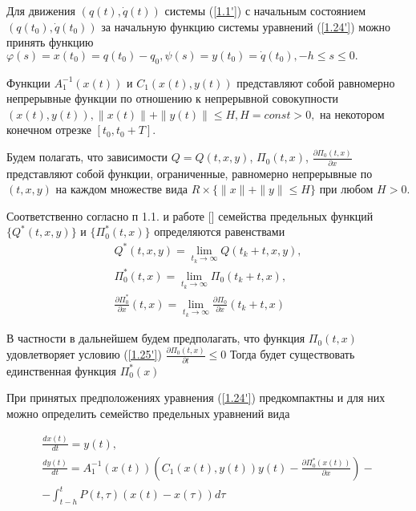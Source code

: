 Для движения $(q(t), \dot q(t))$ системы (\ref{1.1'}) с начальным состоянием $(q(t_0), \dot q(t_0))$ за начальную функцию системы уравнений (\ref{1.24'}) можно принять функцию $\varphi (s) = x(t_0) = q(t_0) - q_0, \psi (s) = y(t_0) = \dot q (t_0), -h \le s \le 0.$

Функции $A_1^{-1} (x(t))$ и $C_1(x(t), y(t))$ представляют собой равномерно непрерывные функции по отношению к непрерывной совокупности $(x(t), y(t)), \| x(t) \| + \| y(t) \| \le H, H = const > 0,$ на некотором конечном отрезке $[t_0, t_0 + T].$

Будем полагать, что зависимости $Q = Q(t, x, y)$, $\Pi_0 (t, x)$, $\frac{\partial \Pi_0 (t, x)}{\partial x}$ представляют собой функции, ограниченные, равномерно непрерывные по $(t, x, y)$ на каждом множестве вида $R \times \lbrace \| x \| + \| y \| \le H \rbrace$ при любом $H > 0.$

Соответственно согласно п 1.1. и работе [] семейства предельных функций $\lbrace Q^{*} (t, x, y) \rbrace$ и $\lbrace \Pi_0^{*} (t, x) \rbrace$ определяются равенствами 
$$\begin{array}{c}
	\displaystyle Q^{*} (t, x, y) = \lim_{t_k \to \infty} Q(t_k + t, x, y),\\
	\displaystyle \Pi_0^{*} (t, x) = \lim_{t_k \to \infty} \Pi_0 (t_k + t, x),\\ 
	\displaystyle \frac{\partial \Pi_0^{*}}{\partial x} (t, x) = \lim_{t_k \to \infty} \frac{\partial \Pi_0}{\partial x} (t_k + t, x)
\end{array}$$

В частности в дальнейшем будем предполагать, что функция $\Pi_0 (t, x)$ удовлетворяет условию (\ref{1.25'}) $\frac{\partial \Pi_0 (t, x)}{\partial t} \le 0$ Тогда будет существовать единственная функция $\Pi_0^{*} (x)$

При принятых предположениях уравнения (\ref{1.24'}) предкомпактны и для них можно определить семейство предельных уравнений вида 

\begin{equation} \label{1.25'}
	\begin{array}{c}
		\frac{d x(t)}{d t} = y(t),\\
		\frac{d y(t)}{d t} = A_1^{-1} (x(t)) (C_1 (x(t), y(t)) y(t) - \frac{\partial \Pi_0^{*} (x(t))}{\partial x}) -\\- \displaystyle \int_{t- h}^{t} P(t, \tau) (x(t) - x(\tau)) d \tau
	\end{array}
\end{equation}

